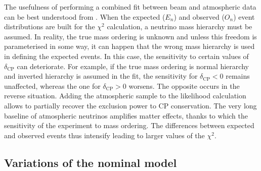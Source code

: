 The usefulness of performing a combined fit between beam and atmospheric %
data can be best understood from .
When the expected ($E_n$) and observed ($O_n$) event distributions are built for the $\chi^2$ calculation, %
a neutrino mass hierarchy must be assumed.
In reality, the true mass ordering is unknown and unless this freedom is parameterised in some way, %
it can happen that the wrong mass hierarchy is used in defining the expected events.
In this case, the sensitivity to certain values of $\delta_\text{CP}$ can deteriorate.
For example, if the true mass ordering is normal hierarchy and inverted hierarchy is assumed in the fit, %
the sensitivity for $\delta_\text{CP} < 0$ remains unaffected, whereas the one for $\delta_\text{CP} > 0$ worsens.
The opposite occurs in the reverse situation.
Adding the atmospheric sample to the likelihood calculation allows to partially recover the exclusion power to CP conservation.
The very long baseline of atmospheric neutrinos amplifies matter effects, thanks to which the sensitivity %
of the experiment to mass ordering.
The differences between expected and observed events thus intensify leading to larger values of the $\chi^2$.


\subsection{Variations of the nominal model}
\label{sec:variations}


